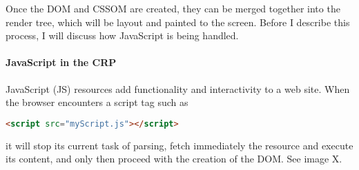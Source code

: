 
Once the DOM and CSSOM are created, they can be merged together into the render tree, which will be layout and painted to the screen.
Before I describe this process, I will discuss how JavaScript is being handled.















\paragraph{JavaScript in the CRP}



JavaScript (JS) resources add functionality and interactivity to a web site.
When the browser encounters a script tag such as

\begin{lstlisting}[language=html, numbers=none]
<script src="myScript.js"></script>
\end{lstlisting}

it will stop its current task of parsing, fetch immediately the resource and execute its content, and only then proceed with the creation of the DOM. %
See image X.

